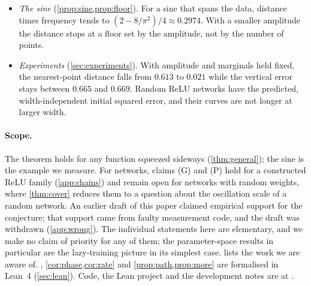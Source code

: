 \begin{itemize}
uniform point in a planar region of area $V$ it is at least
$V/(4l+2\sqrt{\pi V})$.
\item \emph{The sine} (\cref{prop:sine,prop:floor}). For a sine that spans the
data, distance times frequency tends to $(2-8/\pi^2)/4\approx0.2974$. With a
smaller amplitude the distance stops at a floor set by the amplitude, not by
the number of points.
\item \emph{Experiments} (\cref{sec:experiments}). With amplitude and marginals
held fixed, the nearest-point distance falls from $0.613$ to $0.021$ while the
vertical error stays between $0.665$ and $0.669$. Random ReLU networks have the
predicted, width-independent initial squared error, and their curves are not
longer at larger width.
\end{itemize}

\paragraph{Scope.} The theorem holds for any function squeezed sideways
(\cref{thm:general}); the sine is the example we measure. For networks, claims
(G) and (P) hold for a constructed ReLU family (\cref{app:chains}) and remain
open for networks with random weights, where \cref{thm:cover} reduces them to
a question about the oscillation scale of a random network. An earlier draft of this paper claimed
empirical support for the conjecture; that support came from faulty measurement
code, and the draft was withdrawn (\cref{app:wrong}). The individual statements
here are elementary, and we make no claim of priority for any of them; the
parameter-space results in particular are the lazy-training picture in its
simplest case.  lists the work we are aware of.
,
\cref{cor:phase,cor:rate} and \cref{prop:path,prop:more} are formalised in
Lean~4 (\cref{sec:lean}). Code, the Lean project and the development notes are
at \repo.

